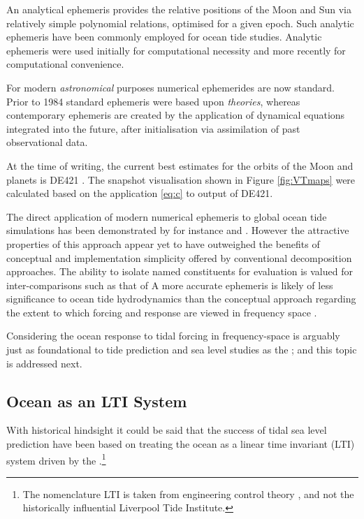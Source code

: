 An analytical ephemeris provides the relative positions of the Moon and Sun via relatively simple polynomial relations, optimised for a given epoch.  Such analytic ephemeris have been commonly employed for ocean tide studies.   Analytic ephemeris were used initially for computational necessity and more recently for computational convenience.


For modern \emph{astronomical} purposes numerical ephemerides are now standard.  Prior to 1984 standard ephemeris were based upon \emph{theories}\cite[sec 8.1]{Urban:2013vl}, whereas contemporary ephemeris are created by the application of dynamical equations integrated into the future, after initialisation via assimilation of past observational data.

At the time of writing, the current best estimates for the orbits of the Moon and planets is DE421 \citep{Folkner:2008wm}.   The snapshot visualisation shown in Figure \ref{fig:VTmaps} were calculated based on the application \ref{eq:c} to output of DE421.


The direct application of modern numerical ephemeris to global ocean tide simulations has been demonstrated by for instance \cite{Weis:2008ex} and \cite{10.1007/s10236-016-1016-1}.
However the attractive properties of this approach appear yet to have outweighed the benefits of conceptual and implementation simplicity offered by conventional decomposition approaches.   The ability to isolate named constituents for evaluation is valued for inter-comparisons such as that of \cite{Stammer:2014vh}
A more accurate ephemeris is likely of less significance to ocean tide hydrodynamics than the conceptual approach regarding the extent to which forcing and response are viewed in frequency space \citep{10.17125/gov2018.ch13}.

Considering the ocean response to tidal forcing in frequency-space is arguably just as foundational to tide prediction and sea level studies as the \ATGP{}; and this topic is addressed next.  

\subsection{Ocean as an LTI System}
\label{sec:LTI}
With historical hindsight it could be said that the success of tidal sea level prediction have been based on treating the ocean as a linear time invariant (LTI) system driven by the \ATGP{}.\footnote{The nomenclature LTI is taken from engineering control theory , and not the historically influential Liverpool Tide Institute.}

